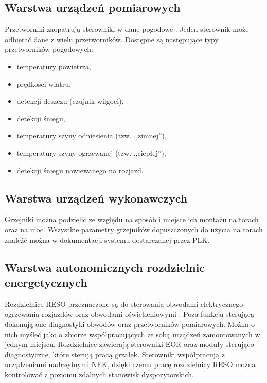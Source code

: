 \subsection{Warstwa urządzeń pomiarowych}
Przetworniki zaopatrują sterowniki w dane pogodowe \cite{dimacek-wytyczne}. Jeden sterownik może odbierać dane z wielu przetworników. Dostępne są następujące typy przetworników pogodowych:
\begin{itemize}
\item temperatury powietrza,
\item prędkości wiatru,
\item detekcji deszczu (czujnik wilgoci),
\item detekcji śniegu,
\item temperatury szyny odniesienia (tzw. ,,zimnej''),
\item temperatury szyny ogrzewanej (tzw. ,,ciepłej''),
\item detekcji śniegu nawiewanego na rozjazd.
\end{itemize}

\subsection{Warstwa urządzeń wykonawczych}
Grzejniki można podzielić ze względu na sposób i miejsce ich montażu na torach oraz na moc. Wszystkie parametry grzejników dopuszczonych do użycia na torach znaleźć można w dokumentacji systemu dostarczanej przez PLK.


\subsection{Warstwa autonomicznych rozdzielnic energetycznych}
Rozdzielnice RESO przeznaczone są do sterowania obwodami elektrycznego ogrzewania rozjazdów oraz obwodami oświetleniowymi \cite{dimacek-wytyczne}. Poza funkcją sterującą dokonują one diagnostyki obwodów oraz przetworników pomiarowych. Można o nich myśleć jako o zbiorze współpracujących ze sobą urządzeń zamontowanych w jednym miejscu. Rozdzielnice zawierają sterowniki EOR oraz moduły sterująco-diagnostyczne, które sterują pracą grzałek. Sterowniki współpracują z urządzeniami nadrzędnymi NEK, dzięki czemu pracę rozdzielnicy RESO można kontrolować z poziomu zdalnych stanowisk dyspozytorskich.

